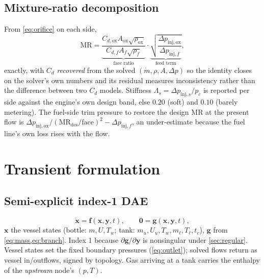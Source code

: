 \documentclass[11pt,a4paper]{article}
\newcommand{\mdot}{\dot{m}}
\begin{document}
\subsection{Mixture-ratio decomposition}
From \cref{eq:orifice} on each side,
\begin{equation}
  \mathrm{MR} = \underbrace{\frac{C_{d,\mathrm{ox}}A_{\mathrm{ox}}\sqrt{\rho_{\mathrm{ox}}}}{C_{d,f}A_f\sqrt{\rho_f}}}_{\text{face ratio}}
  \cdot
  \underbrace{\sqrt{\frac{\Delta p_{\mathrm{inj,ox}}}{\Delta p_{\mathrm{inj},f}}}}_{\text{feed term}},
\end{equation}
exactly, with $C_d$ \emph{recovered} from the solved $(\mdot,\rho,A,\Delta p)$
so the identity closes on the solver's own numbers and its residual measures
inconsistency rather than the difference between two $C_d$ models. Stiffness
$\Lambda_s=\Delta p_{\mathrm{inj},s}/p_c$ is reported per side against the
engine's own design band, else $0.20$ (soft) and $0.10$ (barely metering). The
fuel-side trim pressure to restore the design MR at the present flow is
$\Delta p_{\mathrm{inj,ox}}/(\mathrm{MR}_{\mathrm{des}}/\text{face})^2 - \Delta p_{\mathrm{inj},f}$,
an under-estimate because the fuel line's own loss rises with the flow.

\section{Transient formulation}\label{sec:dae}

\subsection{Semi-explicit index-1 DAE}
\begin{equation}
  \dot{\mathbf{x}} = \mathbf{f}(\mathbf{x},\mathbf{y},t),\qquad
  \mathbf{0}=\mathbf{g}(\mathbf{x},\mathbf{y},t),
  \label{eq:dae}
\end{equation}
$\mathbf{x}$ the vessel states (bottle: $m,U,T_w$; tank: $m_u,U_u,T_w,m_\ell,T_\ell,t_c$),
$\mathbf{g}$ from \cref{eq:mass,eq:branch}. Index 1 because
$\partial\mathbf{g}/\partial\mathbf{y}$ is nonsingular under \cref{sec:regular}.
Vessel states set the fixed boundary pressures (\cref{eq:outlet}); solved flows
return as vessel in/outflows, signed by topology. Gas arriving at a tank
carries the enthalpy of the \emph{upstream} node's $(p,T)$.
\end{document}
